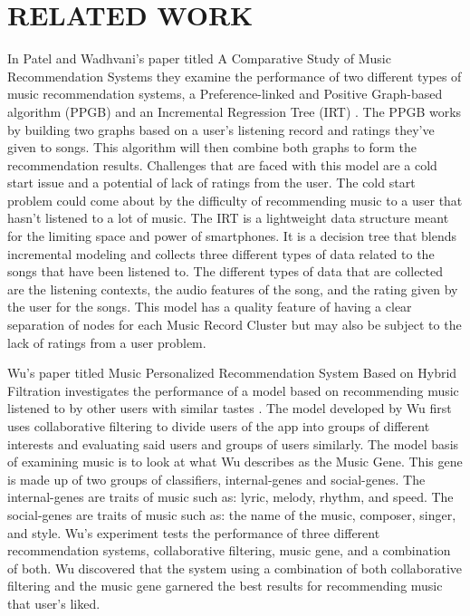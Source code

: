 \documentclass[letterpaper, 10 pt, conference]{ieeeconf}
\begin{document}

\section{RELATED WORK}
In Patel and Wadhvani’s paper titled A Comparative Study of Music Recommendation Systems they examine the performance of two different types of music recommendation systems, a Preference-linked and Positive Graph-based algorithm (PPGB) and an Incremental Regression Tree (IRT) \cite{two}. The PPGB works by building two graphs based on a user’s listening record and ratings they’ve given to songs. This algorithm will then combine both graphs to form the recommendation results. Challenges that are faced with this model are a cold start issue and a potential of lack of ratings from the user. The cold start problem could come about by the difficulty of recommending music to a user that hasn’t listened to a lot of music. The IRT is a lightweight data structure meant for the limiting space and power of smartphones. It is a decision tree that blends incremental modeling and collects three different types of data related to the songs that have been listened to. The different types of data that are collected are the listening contexts, the audio features of the song, and the rating given by the user for the songs. This model has a quality feature of having a clear separation of nodes for each Music Record Cluster but may also be subject to the lack of ratings from a user problem.

Wu’s paper titled Music Personalized Recommendation System Based on Hybrid Filtration investigates the performance of a model based on recommending music listened to by other users with similar tastes \cite{three}. The model developed by Wu first uses collaborative filtering to divide users of the app into groups of different interests and evaluating said users and groups of users similarly. The model basis of examining music is to look at what Wu describes as the Music Gene. This gene is made up of two groups of classifiers, internal-genes and social-genes. The internal-genes are traits of music such as: lyric, melody, rhythm, and speed. The social-genes are traits of music such as: the name of the music, composer, singer, and style. Wu’s experiment tests the performance of three different recommendation systems, collaborative filtering, music gene, and a combination of both. Wu discovered that the system using a combination of both collaborative filtering and the music gene garnered the best results for recommending music that user’s liked.
\end{document}
